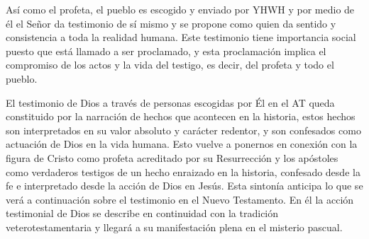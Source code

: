 Así como el profeta, el pueblo es escogido y enviado por YHWH y por medio de él
el Señor da testimonio de sí mismo y se propone como quien da sentido y
consistencia a toda la realidad humana. Este testimonio tiene importancia social
puesto que está llamado a ser proclamado, y esta proclamación implica el
compromiso de los actos y la vida del testigo, es decir, del profeta y todo el
pueblo.\autocite[Cf.][1526s]{latourelle2000testimonio}

El testimonio de Dios a través de personas escogidas por Él en el AT queda
constituido por la narración de hechos que acontecen en la historia, estos
hechos son interpretados en su valor absoluto y carácter redentor, y son
confesados como actuación de Dios en la vida
humana.\autocite[Cf.][119]{prades2015testimonio} Esto vuelve a ponernos en
conexión con la figura de Cristo como profeta acreditado por su Resurrección y
los apóstoles como verdaderos testigos de un hecho enraizado en la historia,
confesado desde la fe e interpretado desde la acción de Dios en Jesús. Esta
sintonía anticipa lo que se verá a continuación sobre el testimonio en el Nuevo
Testamento. En él la acción testimonial de Dios se describe en continuidad con
la tradición veterotestamentaria y llegará a su manifestación plena en el
misterio pascual.
